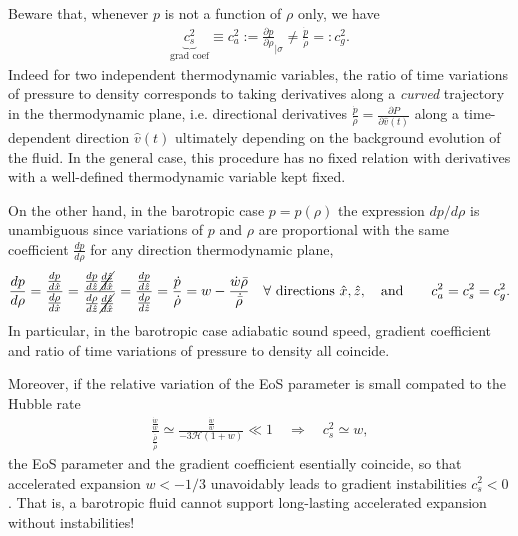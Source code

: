 Beware that, whenever $p$ is not a function of $\rho$ only, we have
\begin{align}
    \underbrace{c_s^2}_{\text{grad coef}}\equiv c_a^2:=\frac{\partial p}{\partial \rho}_{|\sigma}\neq \frac{\dot{p}}{\dot{\rho}}=:c_g^2.
\end{align}
Indeed for two independent thermodynamic variables, the ratio of time variations of pressure to density corresponds to taking derivatives along a \emph{curved} trajectory in the thermodynamic plane, i.e. directional derivatives $\tfrac{\dot{p}}{\dot{\rho}}=\tfrac{\partial P}{\partial \hat{v}(t)}$ along a time-dependent direction $\hat{v}(t)$ ultimately depending on the background evolution of the fluid.
In the general case, this procedure has no fixed relation with derivatives with a well-defined thermodynamic variable kept fixed.

On the other hand, in the barotropic case $p=p(\rho)$ the expression $dp/d\rho$ is unambiguous since variations of $p$ and $\rho$ are proportional with the same coefficient $\tfrac{dp}{d\rho}$ for any direction  thermodynamic plane,
\begin{align}\label{eq:barotropic_speed_of_sound}
    \frac{dp}{d\rho}=\frac{\tfrac{dp}{d\hat{x}}}{\tfrac{d\rho}{d\hat{x}}}=\frac{\tfrac{dp}{d\hat{z}}\cancel{\tfrac{d\hat{z}}{d\hat{x}}}}{\tfrac{d\rho}{d\hat{z}}\cancel{\tfrac{d\hat{z}}{d\hat{x}}}}=\frac{\tfrac{dp}{d\hat{z}}}{\tfrac{d\rho}{d\hat{z}}} = \frac{\dot{p}}{\dot{\rho}}=w-\frac{\dot{w}\bar{\rho}}{\dot{\bar{\rho}}}\quad \forall  \text{ directions } \hat{x},\hat{z}, \quad \text{and}\qquad c_a^2=c_s^2=c_g^2.
\end{align}
In particular, in the barotropic case adiabatic sound speed, gradient coefficient and ratio of time variations of pressure to density all coincide.

Moreover, if the relative variation of the EoS parameter is small compated to the Hubble rate
\begin{align}
    \frac{\tfrac{\dot{w}}{w}}{\tfrac{\dot{\bar{\rho}}}{\bar{\rho}}}\simeq \frac{\tfrac{\dot{w}}{w}}{-3\mathcal{H}(1+w)}\ll 1 \quad \Rightarrow \quad c_s^2\simeq w,
\end{align}
the EoS parameter and the gradient coefficient esentially coincide, so that accelerated expansion $w<-1/3$ unavoidably leads to gradient instabilities $c_s^2<0$.
That is, a barotropic fluid cannot support long-lasting accelerated expansion without instabilities!

